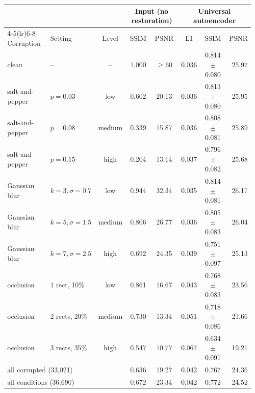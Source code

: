 \begin{tabular}{llcccccr}
\toprule
 & & & \multicolumn{2}{c}{Input (no restoration)} & \multicolumn{3}{c}{Universal autoencoder} \\
\cmidrule(lr){4-5}\cmidrule(lr){6-8}
Corruption & Setting & Level & SSIM & PSNR & L1 & SSIM & PSNR \\
\midrule
clean & -- & -- & 1.000 & $\geq$60 & 0.036 & 0.814$\pm$0.080 & 25.97 \\
salt-and-pepper & $p{=}0.03$ & low & 0.602 & 20.13 & 0.036 & 0.813$\pm$0.080 & 25.95 \\
salt-and-pepper & $p{=}0.08$ & medium & 0.339 & 15.87 & 0.036 & 0.808$\pm$0.081 & 25.89 \\
salt-and-pepper & $p{=}0.15$ & high & 0.204 & 13.14 & 0.037 & 0.796$\pm$0.082 & 25.68 \\
Gaussian blur & $k{=}3,\sigma{=}0.7$ & low & 0.944 & 32.34 & 0.035 & 0.814$\pm$0.081 & 26.17 \\
Gaussian blur & $k{=}5,\sigma{=}1.5$ & medium & 0.806 & 26.77 & 0.036 & 0.805$\pm$0.083 & 26.04 \\
Gaussian blur & $k{=}7,\sigma{=}2.5$ & high & 0.692 & 24.35 & 0.039 & 0.751$\pm$0.097 & 25.13 \\
occlusion & 1 rect, 10\% & low & 0.861 & 16.67 & 0.043 & 0.768$\pm$0.083 & 23.56 \\
occlusion & 2 rects, 20\% & medium & 0.730 & 13.34 & 0.051 & 0.718$\pm$0.086 & 21.66 \\
occlusion & 3 rects, 35\% & high & 0.547 & 10.77 & 0.067 & 0.634$\pm$0.091 & 19.21 \\
\midrule
\multicolumn{3}{l}{all corrupted (33,021)} & 0.636 & 19.27 & 0.042 & 0.767 & 24.36 \\
\multicolumn{3}{l}{all conditions (36,690)} & 0.672 & 23.34 & 0.042 & 0.772 & 24.52 \\
\bottomrule
\end{tabular}
